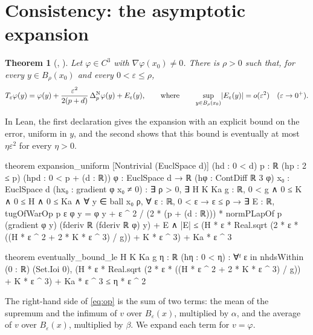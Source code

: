 \documentclass[11pt,reqno]{amsart}
\newcommand{\eps}{\varepsilon}
\newcommand{\pnlap}{\Delta_p^{\mathrm{N}}}       %
\newcommand{\Op}{T_{\eps}}                       %
\DeclarePairedDelimiter{\abs}{\lvert}{\rvert}
\theoremstyle{plain}
\newtheorem{theorem}{Theorem}[section]
\theoremstyle{definition}
\theoremstyle{remark}
\begin{document}
\section{Consistency: the asymptotic expansion}\label{sec:consistency}

\begin{theorem}[, ]\label{thm:exp}
Let $\varphi \in C^3$ with $\nabla\varphi(x_0) \ne 0$. There is $\rho > 0$
such that, for every $y \in B_\rho(x_0)$ and every $0 < \eps \le \rho$,
\[
  \Op\varphi(y) = \varphi(y) + \frac{\eps^2}{2(p+d)}\,\pnlap\varphi(y)
     + E_\eps(y),
  \qquad\text{where}\qquad
  \sup_{y \in B_\rho(x_0)} \abs{E_\eps(y)} = o(\eps^2) \quad (\eps \to 0^+).
\]
\end{theorem}

\noindent In Lean, the first declaration gives the expansion with an explicit
bound on the error, uniform in $y$, and the second shows that this bound is
eventually at most $\eta\eps^2$ for every $\eta > 0$.
\begin{lean}
theorem expansion_uniform [Nontrivial (EuclSpace d)] (hd : 0 < d)
    {p : ℝ} (hp : 2 ≤ p) (hpd : 0 < p + (d : ℝ))
    {φ : EuclSpace d → ℝ} (hφ : ContDiff ℝ 3 φ) {x₀ : EuclSpace d}
    (hx₀ : gradient φ x₀ ≠ 0) :
    ∃ ρ > 0, ∃ H K Ka g : ℝ, 0 < g ∧ 0 ≤ K ∧ 0 ≤ H ∧ 0 ≤ Ka ∧
      ∀ y ∈ ball x₀ ρ, ∀ ε : ℝ, 0 < ε → ε ≤ ρ →
        ∃ E : ℝ,
          tugOfWarOp p ε φ y
              = φ y + ε ^ 2 / (2 * (p + (d : ℝ)))
                  * normPLapOf p (gradient φ y)
                      (fderiv ℝ (fderiv ℝ φ) y) + E
            ∧ |E| ≤ (H * ε * Real.sqrt
                  (2 * ε * ((H * ε ^ 2 + 2 * K * ε ^ 3) / g))
                + K * ε ^ 3) + Ka * ε ^ 3

theorem eventually_bound_le {H K Ka g η : ℝ} (hη : 0 < η) :
    ∀ᶠ ε in nhdsWithin (0 : ℝ) (Set.Ioi 0),
      (H * ε * Real.sqrt (2 * ε * ((H * ε ^ 2 + 2 * K * ε ^ 3) / g))
          + K * ε ^ 3) + Ka * ε ^ 3 ≤ η * ε ^ 2
\end{lean}

The right-hand side of \eqref{eq:op} is the sum of two terms: the mean of the
supremum and the infimum of $v$ over $B_\eps(x)$, multiplied by $\alpha$, and
the average of $v$ over $B_\eps(x)$, multiplied by $\beta$. We expand each
term for $v = \varphi$.
\end{document}
